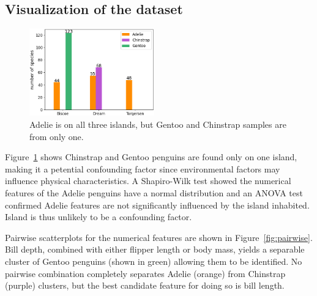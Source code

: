 \documentclass[a4paper, 11pt]{article}
\begin{document}
\subsection*{Visualization of the dataset}

\begin{figure} %
  \centering
  \vspace{-1\baselineskip} %
  \includegraphics[width=0.48\textwidth]{islands.png} %
  \vspace{-0.5\baselineskip} %
  \caption{\centering\linespread{0.8}\selectfont Adelie is on all three islands, but Gentoo and Chinstrap samples are from only one.}
  \vspace{-0.5\baselineskip} %
  \label{fig:islands}
\end{figure}
Figure~\ref{fig:islands} shows Chinstrap and Gentoo penguins are found only on one island, making it a petential confounding factor since 
environmental factors may influence physical characteristics. A Shapiro-Wilk test showed  
the numerical features of the Adelie penguins have a normal distribution and an ANOVA test confirmed Adelie features are not 
significantly influenced by the island inhabited. Island is thus unlikely to be a confounding factor.

Pairwise scatterplots for the numerical features are shown in Figure~\ref{fig:pairwise}. 
Bill depth, combined with either flipper length or body mass, 
yields a separable cluster of Gentoo penguins (shown in green) allowing them to be identified. 
No pairwise combination completely separates Adelie (orange) from Chinstrap (purple) clusters, 
but the best candidate feature for doing so is bill length.
\end{document}
